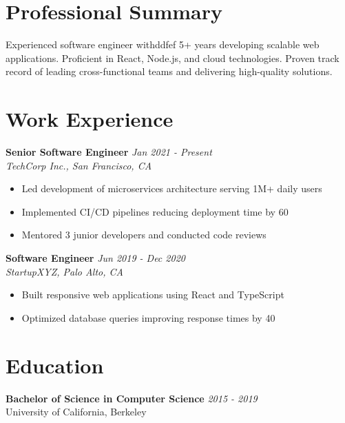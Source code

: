 \documentclass{article}
\begin{document}
\section*{Professional Summary}
Experienced software engineer withddfef  5+ years developing scalable web applications. Proficient in React, Node.js, and cloud technologies. Proven track record of leading cross-functional teams and delivering high-quality solutions.

\vspace{0.2cm}

\section*{Work Experience}

\textbf{Senior Software Engineer} \hfill \textit{Jan 2021 - Present} \\
\textit{TechCorp Inc., San Francisco, CA}
\begin{itemize}[leftmargin=*]
    \item Led development of microservices architecture serving 1M+ daily users
    \item Implemented CI/CD pipelines reducing deployment time by 60%
    \item Mentored 3 junior developers and conducted code reviews
\end{itemize}

\textbf{Software Engineer} \hfill \textit{Jun 2019 - Dec 2020} \\
\textit{StartupXYZ, Palo Alto, CA}
\begin{itemize}[leftmargin=*]
    \item Built responsive web applications using React and TypeScript
    \item Optimized database queries improving response times by 40%
\end{itemize}

\vspace{0.2cm}

\section*{Education}
\textbf{Bachelor of Science in Computer Science} \hfill \textit{2015 - 2019} \\
University of California, Berkeley

\vspace{0.2cm}
\end{document}
